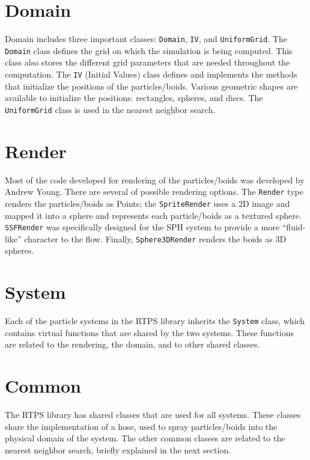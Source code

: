 \section{Domain}
Domain includes three important classes: \texttt{Domain}, \texttt{IV}, and \texttt{UniformGrid}. The \texttt{Domain} class defines the grid on which the simulation is being computed. This class also stores the different grid parameters that are needed throughout the computation. The \texttt{IV} (Initial Values) class defines and implements the methods that initialize the positions of the particles/boids. Various geometric shapes are available to initialize the positions: rectangles, spheres, and discs. The \texttt{UniformGrid} class is used in the nearest neighbor search.

\section{Render}
Most of the code developed for rendering of the particles/boids was developed by Andrew Young\cite{andrewBlog}. There are several of possible rendering options. The \texttt{Render} type renders the particles/boids as Points; the \texttt{SpriteRender} uses a 2D image and mapped it into a sphere and represents each particle/boids as a textured sphere. \texttt{SSFRender} was specifically designed for the SPH system to provide a more ``fluid-like'' character to the flow. Finally, \texttt{Sphere3DRender} renders the boids as 3D spheres.  

\section{System}
Each of the particle systems in the RTPS library inherits the \texttt{System} class, which contains virtual functions that are shared by the two systems. These functions are related to the rendering,  the domain, and to other shared classes. 

\section{Common}\label{commonsection}
The RTPS library has shared classes that are used for all systems. These classes share the implementation of a hose, used to spray particles/boids into the physical domain of the system. The other common classes are related to the nearest neighbor search, briefly explained in the next section. 

